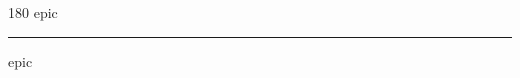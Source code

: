 
\begin{frame}
\begin{center}
\begin{turn}{180}
{\fontsize{2.5cm}{1em}\selectfont epic}
\end{turn}
\vspace{1em}\par  
\hrule
\vspace{1em}\par  
{\fontsize{2.5cm}{1em}\selectfont epic}
\end{center}
\end{frame}
